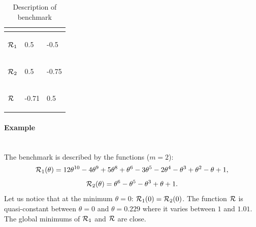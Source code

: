 \begin{table}[h!]
	\centering
	\caption{Description of benchmark \exTwo}
	\begin{tabular}{lll}
		
		\toprule
		\begin{bf} \diagbox{Functions}{Minimums} \end{bf} & \begin{bf}\mg\end{bf} & \begin{bf}\ml\end{bf} \\
		\midrule
		
		\begin{bf}$\mathcal{R}_1$\end{bf} & 0.5 & -0.5  \\ \midrule
		\begin{bf}$\mathcal{R}_2$\end{bf} & 0.5 & -0.75 \\ \midrule
		\begin{bf}$\mathcal{R}$\end{bf}   & -0.71 & 0.5 \\ \bottomrule
	\end{tabular}
	\label{ex2_example}
\end{table}

\paragraph{Example \exThree}
~~\\
The benchmark is described by the functions ($m=2$):
\begin{equation*}
	\mathcal{R}_1(\theta) = 12\theta^{10}-4\theta^9+5\theta^8+\theta^6-3\theta^5-2\theta^4-\theta^3+\theta^2-\theta+1,
\end{equation*}
\begin{equation*}
	\mathcal{R}_2(\theta) = \theta^6-\theta^5-\theta^3+\theta+1.
\end{equation*}
Let us notice that at the minimum $\theta=0$: $\mathcal{R}_1(0)=\mathcal{R}_2(0)$. The function $\mathcal{R}$ is quasi-constant between $\theta=0$ and $\theta=0.229$ where it varies between $1$ and $1.01$. The global minimums of $\mathcal{R}_1$ and $\mathcal{R}$ are close.

